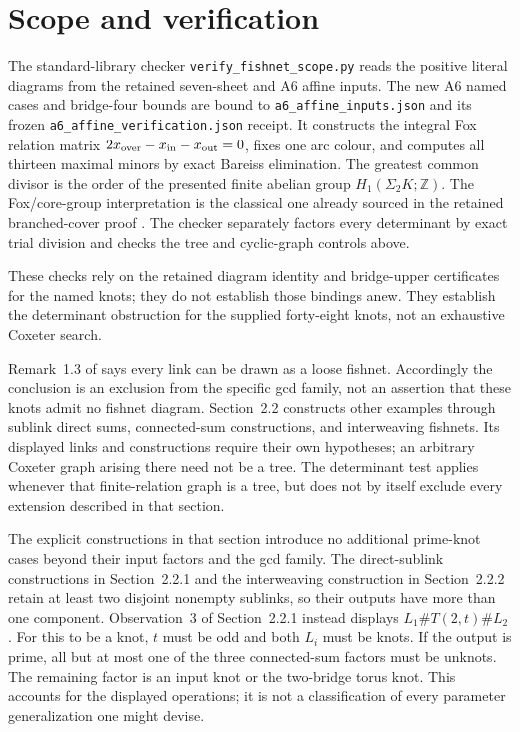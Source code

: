 \documentclass[11pt]{article}
\newcommand{\Z}{\mathbb Z}
\begin{document}
\section{Scope and verification}

The standard-library checker \texttt{verify\_fishnet\_scope.py}
reads the positive literal diagrams from the retained seven-sheet
and A6 affine inputs. The new A6 named cases and bridge-four bounds
are bound to \texttt{a6\_affine\_inputs.json} and its frozen
\texttt{a6\_affine\_verification.json} receipt.  It constructs the integral Fox relation matrix
$2x_{\rm over}-x_{\rm in}-x_{\rm out}=0$, fixes one arc colour,
and computes all thirteen maximal minors by exact Bareiss
elimination.  The greatest common divisor is the order of the
presented finite abelian group $H_1(\Sigma_2K;\Z)$.
The Fox/core-group interpretation is the classical one already
sourced in the retained branched-cover proof \cite{core}.
The checker separately factors every determinant by exact trial
division and checks the tree and cyclic-graph controls above.

These checks rely on the retained diagram identity and bridge-upper
certificates for the named knots; they do not establish those
bindings anew.  They establish the determinant obstruction for
the supplied forty-eight knots, not an exhaustive Coxeter search.

Remark~1.3 of \cite{bkp} says every link can be drawn as a loose
fishnet.  Accordingly the conclusion is an exclusion from the
specific gcd family, not an assertion that these knots admit no
fishnet diagram.  Section~2.2 constructs other examples through
sublink direct sums, connected-sum constructions, and interweaving
fishnets.  Its displayed links and constructions require their own
hypotheses; an arbitrary Coxeter graph arising there need not be
a tree.  The determinant test applies whenever that finite-relation
graph is a tree, but does not by itself exclude every extension
described in that section.

The explicit constructions in that section introduce no additional
prime-knot cases beyond their input factors and the gcd family.
The direct-sublink constructions in Section~2.2.1 and the interweaving
construction in Section~2.2.2 retain at least two disjoint nonempty
sublinks, so their outputs have more than one component.  Observation~3
of Section~2.2.1 instead displays
$L_1\#T(2,t)\#L_2$.  For this to be a knot, $t$ must be odd and
both $L_i$ must be knots.  If the output is prime, all but at most
one of the three connected-sum factors must be unknots.  The
remaining factor is an input knot or the two-bridge torus knot.
This accounts for the displayed operations; it is not a classification
of every parameter generalization one might devise.
\end{document}
